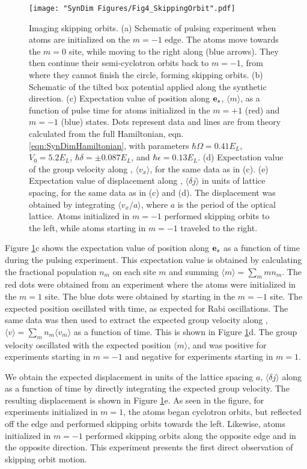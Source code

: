 \begin{figure}
	\texttt{[image: "SynDim Figures/Fig4\_SkippingOrbit".pdf]}
\caption[Imaging skipping orbits]{Imaging skipping orbits. (a) Schematic of pulsing experiment when atoms are initialized on the $m=-1$ edge. The atoms move towards the $m=0$ site, while moving to the right along \ex{} (blue arrows). They then continue their semi-cyclotron orbits back to $m=-1$, from where they cannot finish the circle, forming skipping orbits.  (b) Schematic of the tilted box potential applied along the synthetic direction. (c) Expectation value of position along $\textbf{e}_s{}$, $\langle m \rangle$, as a function of pulse time for atoms initialized in the $m=+1$ (red) and $m=-1$ (blue) states. Dots represent data and lines are from theory calculated from the full Hamiltonian, eqn. \ref{eqn:SynDimHamiltonian}, with parameters $\hbar\Omega=0.41 E_L$, $V_0=5.2 E_L$, $\hbar\delta=\pm0.087 E_L$, and $\hbar\epsilon=0.13 E_L$. (d) Expectation value of the group velocity along \ex{}, $\langle v_x\rangle$, for the same data as in (c). (e) Expectation value of displacement along \ex{},  $\langle \delta j \rangle$ in units of lattice spacing, for the same data as in (c) and (d). The displacement was obtained by integrating $\langle v_x/a \rangle$, where $a$ is the period of the optical lattice. Atoms initialized in $m=-1$ performed skipping orbits to the left, while atoms starting in $m=-1$ traveled to the right.  }
\label{fig:skippingOrbits}
\end{figure}

Figure \ref{fig:skippingOrbits}c shows the expectation value of position along $\textbf{e}_s{}$ as a function of time during the pulsing experiment. This expectation value is obtained by calculating the fractional population $n_m$ on each site $m$ and summing $\langle m\rangle = \sum_m m n_m$. The red dots were obtained from an experiment  where the atoms were initialized in the $m=1$ site. The blue dots were obtained by starting in the $m=-1$ site. The expected position oscillated with time, as expected for Rabi oscillations. The same data was then used to extract the expected group velocity along \ex{}, $\langle v \rangle = \sum_m n_m \langle v_m \rangle$ as a function of time. This is shown in Figure \ref{fig:skippingOrbits}d. The group velocity oscillated with the expected position $\langle m \rangle$, and was positive for experiments starting in $m=-1$ and negative for experiments starting in $m=1$. 

We obtain the expected displacement in units of the lattice spacing $a$, $\langle \delta j \rangle$ along \ex{} as a function of time by directly integrating the expected group velocity. The resulting displacement is shown in Figure \ref{fig:skippingOrbits}e. As seen in the figure, for experiments initialized in $m=1$, the atoms began cyclotron orbits, but reflected off the edge and performed skipping orbits towards the left. Likewise, atoms initialized in $m=-1$ performed skipping orbits along the opposite edge and in the opposite direction. This experiment presents the first direct observation of skipping orbit motion. 
